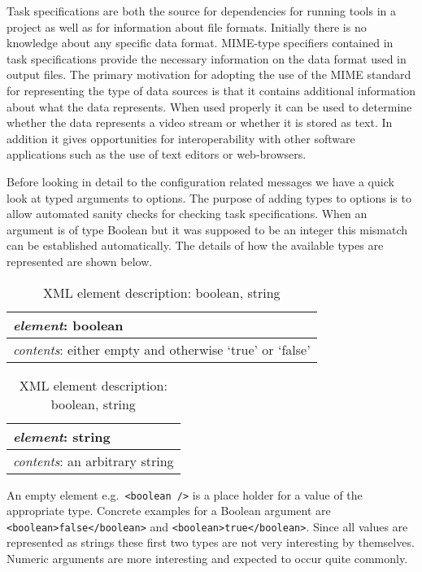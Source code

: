 \documentclass{article}
\begin{document}
   Task specifications are both the source for dependencies for running tools
   in a project as well as for information about file formats. Initially there
   is no knowledge about any specific data format. MIME-type specifiers
   contained in task specifications provide the necessary information on the
   data format used in output files.  The primary motivation for adopting the
   use of the MIME standard for representing the type of data sources is that
   it contains additional information about what the data represents. When used
   properly it can be used to determine whether the data represents a video
   stream or whether it is stored as text. In addition it gives opportunities
   for interoperability with other software applications such as the use of
   text editors or web-browsers.

   Before looking in detail to the configuration related messages we have a
   quick look at typed arguments to options. The purpose of adding types to
   options is to allow automated sanity checks for checking task
   specifications. When an argument is of type Boolean but it was supposed to
   be an integer this mismatch can be established automatically. The details of
   how the available types are represented are shown below.

   \begin{table}[H]
    \begin{center}
    \begin{tabular}{|l|l|}
      \hline
       \multicolumn{2}{|l|}{\textit{element}: boolean} \\
      \hline
       \multicolumn{2}{|l|}{\textit{contents}: either empty and otherwise `true' or `false'} \\
      \hline
    \end{tabular}
    \begin{tabular}{|l|l|}
      \hline
       \multicolumn{2}{|l|}{\textit{element}: string} \\
      \hline
       \multicolumn{2}{|l|}{\textit{contents}: an arbitrary string} \\
      \hline
    \end{tabular}
    \end{center}
    \vspace{-0.5cm}
    \caption{XML element description: boolean, string}
   \end{table}

   \noindent An empty element e.g.\ \verb'<boolean />' is a place holder for a value of
   the appropriate type. Concrete examples for a Boolean argument are
   \verb'<boolean>false</boolean>' and \verb'<boolean>true</boolean>'. Since
   all values are represented as strings these first two types are not very
   interesting by themselves. Numeric arguments are more interesting and
   expected to occur quite commonly.
\end{document}
